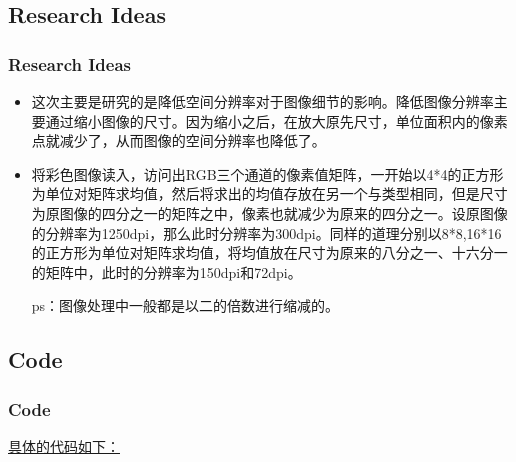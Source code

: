 \documentclass[notheorems,serif,table,compress]{beamer}  %
\begin{document}
\subsection{Research Ideas}
\begin{frame}
\frametitle{Research Ideas}
    \begin{itemize}
        \item 这次主要是研究的是降低空间分辨率对于图像细节的影响。降低图像分辨率主要通过缩小图像的尺寸。因为缩小之后，在放大原先尺寸，单位面积内的像素点就减少了，从而图像的空间分辨率也降低了。
        \item {\color{blue}将彩色图像读入，访问出RGB三个通道的像素值矩阵，一开始以4*4的正方形为单位对矩阵求均值，然后将求出的均值存放在另一个与类型相同，但是尺寸为原图像的四分之一的矩阵之中，像素也就减少为原来的四分之一。设原图像的分辨率为1250dpi，那么此时分辨率为300dpi。同样的道理分别以8*8,16*16的正方形为单位对矩阵求均值，将均值放在尺寸为原来的八分之一、十六分一的矩阵中，此时的分辨率为150dpi和72dpi。}

 ps：图像处理中一般都是以二的倍数进行缩减的。
    \end{itemize}
   
\end{frame}


\subsection{Code}

\begin{frame}
\frametitle{Code}
\href{code/resolution.cpp}{\color{red}具体的代码如下：}
  
\end{frame}
\end{document}
